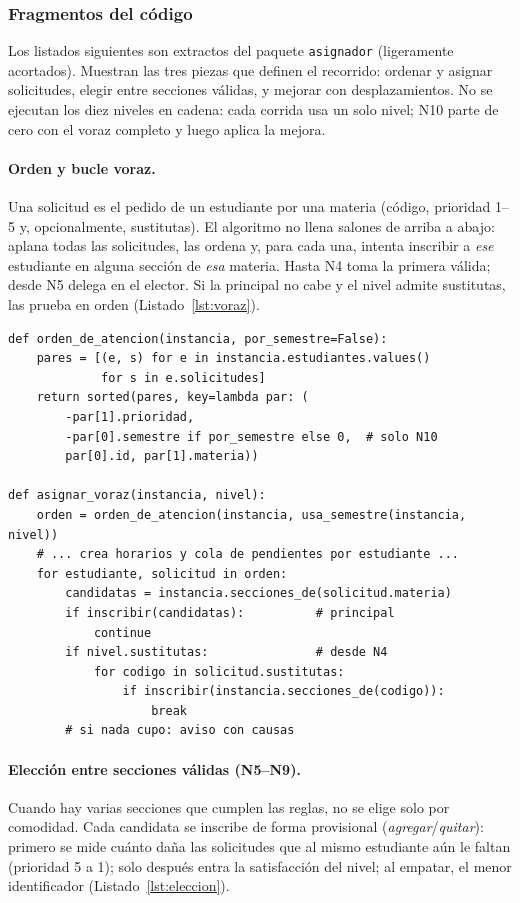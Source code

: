 \subsubsection{Fragmentos del código}\label{sec:codigo}

Los listados siguientes son extractos del paquete \texttt{asignador} (ligeramente acortados). Muestran las tres piezas que definen el recorrido: ordenar y asignar solicitudes, elegir entre secciones válidas, y mejorar con desplazamientos. No se ejecutan los diez niveles en cadena: cada corrida usa un solo nivel; N10 parte de cero con el voraz completo y luego aplica la mejora.

\paragraph{Orden y bucle voraz.} Una solicitud es el pedido de un estudiante por una materia (código, prioridad 1--5 y, opcionalmente, sustitutas). El algoritmo no llena salones de arriba a abajo: aplana todas las solicitudes, las ordena y, para cada una, intenta inscribir a \emph{ese} estudiante en alguna sección de \emph{esa} materia. Hasta N4 toma la primera válida; desde N5 delega en el elector. Si la principal no cabe y el nivel admite sustitutas, las prueba en orden (Listado~\ref{lst:voraz}).

\begin{lstlisting}[style=python,caption={Orden de atenci\'on y bucle voraz (\texttt{voraz.py})},label={lst:voraz}]
def orden_de_atencion(instancia, por_semestre=False):
    pares = [(e, s) for e in instancia.estudiantes.values()
             for s in e.solicitudes]
    return sorted(pares, key=lambda par: (
        -par[1].prioridad,
        -par[0].semestre if por_semestre else 0,  # solo N10
        par[0].id, par[1].materia))

def asignar_voraz(instancia, nivel):
    orden = orden_de_atencion(instancia, usa_semestre(instancia, nivel))
    # ... crea horarios y cola de pendientes por estudiante ...
    for estudiante, solicitud in orden:
        candidatas = instancia.secciones_de(solicitud.materia)
        if inscribir(candidatas):          # principal
            continue
        if nivel.sustitutas:               # desde N4
            for codigo in solicitud.sustitutas:
                if inscribir(instancia.secciones_de(codigo)):
                    break
        # si nada cupo: aviso con causas
\end{lstlisting}

\paragraph{Elección entre secciones válidas (N5--N9).} Cuando hay varias secciones que cumplen las reglas, no se elige solo por comodidad. Cada candidata se inscribe de forma provisional (\emph{agregar}/\emph{quitar}): primero se mide cuánto daña las solicitudes que al mismo estudiante aún le faltan (prioridad 5 a 1); solo después entra la satisfacción del nivel; al empatar, el menor identificador (Listado~\ref{lst:eleccion}).

